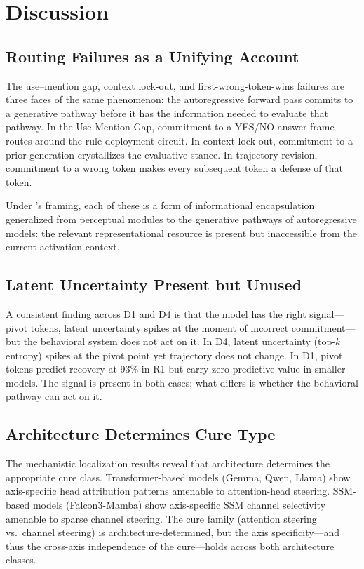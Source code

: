 \documentclass[11pt]{article}
\newcommand{\umg}{Use-Mention Gap}
\begin{document}
\section{Discussion}
\label{sec:discussion}

\subsection{Routing Failures as a Unifying Account}

The use--mention gap, context lock-out, and first-wrong-token-wins
failures are three faces of the same phenomenon: the autoregressive
forward pass commits to a generative pathway before it has the
information needed to evaluate that pathway. In the \umg{}, commitment
to a YES/NO answer-frame routes around the rule-deployment circuit.
In context lock-out, commitment to a prior generation crystallizes
the evaluative stance. In trajectory revision, commitment to a wrong
token makes every subsequent token a defense of that token.

Under \citet{fodor1983modularity}'s framing, each of these is a form
of informational encapsulation generalized from perceptual modules to
the generative pathways of autoregressive models: the relevant
representational resource is present but inaccessible from the current
activation context.

\subsection{Latent Uncertainty Present but Unused}

A consistent finding across D1 and D4 is that the model has the right
signal---pivot tokens, latent uncertainty spikes at the moment of
incorrect commitment---but the behavioral system does not act on it. In
D4, latent uncertainty (top-$k$ entropy) spikes at the pivot point yet
trajectory does not change. In D1, pivot tokens predict recovery at 93\%
in R1 but carry zero predictive value in smaller models. The signal is
present in both cases; what differs is whether the behavioral pathway
can act on it.

\subsection{Architecture Determines Cure Type}

The mechanistic localization results reveal that architecture determines
the appropriate cure class. Transformer-based models (Gemma, Qwen,
Llama) show axis-specific head attribution patterns amenable to
attention-head steering. SSM-based models (Falcon3-Mamba) show
axis-specific SSM channel selectivity amenable to sparse channel steering.
The cure family (attention steering vs.\ channel steering) is
architecture-determined, but the axis specificity---and thus the
cross-axis independence of the cure---holds across both architecture
classes.
\end{document}
